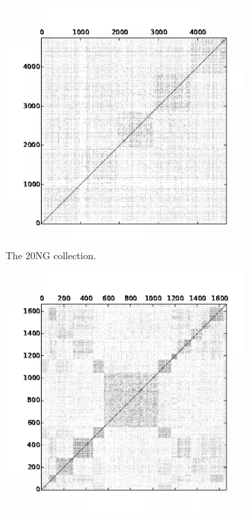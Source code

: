 \documentclass[preprint,12pt,authoryear,review]{elsarticle}
\begin{document}
\begin{figure}[!htbp]
    \centering
    \begin{subfigure}[b]{0.33\textwidth}
        \includegraphics[width=\textwidth]{20NG-simcos}
        \caption{The 20NG collection.}
        \label{fig:20ng_sim}
    \end{subfigure}
    \begin{subfigure}[b]{0.33\textwidth}
        \includegraphics[width=\textwidth]{DOE-simcos}

\end{subfigure}
\end{figure}
\end{document}
